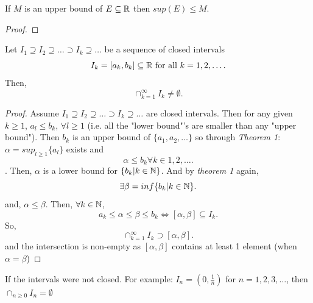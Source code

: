 \documentclass[a4paper]{article}
\begin{document}
\begin{prop}
  If  $M$ is an upper bound of  $E \subseteq \mathbb{R}$ then $sup(E) \leq M$.
   \begin{proof}
    
  \end{proof}
\end{prop}

\begin{lemma}
  Let $I_1 \supseteq I_2 \supseteq \ldots \supset I_k \supseteq \ldots$ be a sequence of closed intervals
  \[
    I_k = [a_k,b_k] \subseteq \mathbb{R} \text{ for all } k=1,2, \ldots
  .\] 
  Then, 
  \[
  \cap_{k=1}^\infty I_k \neq \emptyset
  .\] 
  \begin{proof}
    Assume $I_1 \supseteq I_2 \supseteq \ldots \supset I_k \supseteq \ldots$ are closed intervals. 
    Then for any given $k \geq 1$,  $a_l \leq b_k$,  $\forall l \geq 1$ (i.e. all the "lower bound"'s are smaller 
    than any "upper bound"). Then $b_k$ is an upper bound of  $\{a_1,a_2, \ldots\}$ so through \textit{Theorem 1}:
     $\alpha = sup_{l \geq 1} \{a_l\}$ exists and  
     \[
       \alpha \leq b_k \forall k \in 1,2,\ldots  
     .\]. Then, $\alpha$ is a lower bound for  $\{b_k | k \in \mathbb{N}\}$. And by \textit{theorem 1} again,
     \[
     \exists \beta = inf \{b_k | k \in \mathbb{N}\}  
     .\] 
     and, $\alpha \leq \beta$. Then, $\forall k \in \mathbb{N}$,
     \[
       a_k \leq \alpha \leq \beta \leq b_k \iff [\alpha, \beta] \subseteq I_k 
     .\] 
     So, 
     \[
       \cap_{k=1}^{\infty} I_k \supset [\alpha, \beta]
     .\]
     and the intersection is non-empty as $[\alpha, \beta]$ contains at least 1 element (when  $\alpha = \beta$)
  \end{proof}
\end{lemma}

\begin{note}
  If the intervals were not closed. For example: $I_n = \left( 0, \frac{1}{n} \right) $ for $n=1,2,3,\ldots$,
  then $\cap_{n \geq 0} I_n = \emptyset$
\end{note}
\end{document}

